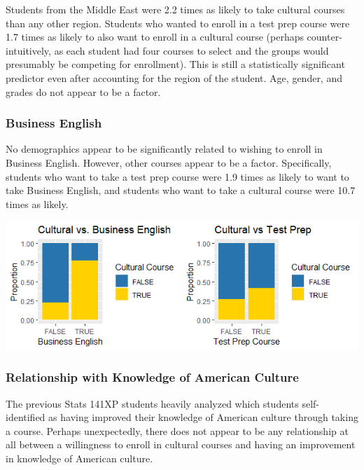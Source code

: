 \documentclass[12pt,letterpaper]{article}
\begin{document}
Students from the Middle East were 2.2 times as likely to take cultural courses than any other region. Students who wanted to enroll in a test prep course were 1.7 times as likely to also want to enroll in a cultural course (perhaps counter-intuitively, as each student had four courses to select and the groups would presumably be competing for enrollment). This is still a statistically significant predictor even after accounting for the region of the student. Age, gender, and grades do not appear to be a factor.

\subsubsection{Business English}

No demographics appear to be significantly related to wishing to enroll in Business English. However, other courses appear to be a factor. Specifically, students who want to take a test prep course were 1.9 times as likely to want to take Business English, and students who want to take a cultural course were 10.7 times as likely.

\begin{center}
    \includegraphics[width = \textwidth]{Plots/course_correlations.png}
\end{center}

\subsubsection{Relationship with Knowledge of American Culture}

The previous Stats 141XP students heavily analyzed which students self-identified as having improved their knowledge of American culture through taking a course. Perhaps unexpectedly, there does not appear to be any relationship at all between a willingness to enroll in cultural courses and having an improvement in knowledge of American culture.
\end{document}
